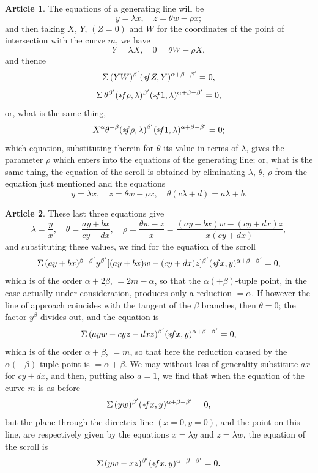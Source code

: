 \documentclass[12pt,a4paper]{article}
\theoremstyle{definition}
\newtheorem{art}{Article}[section]
\begin{document}
\begin{art}
The equations of a generating line will be
\[
y = \lambda x, \quad z = \theta w - \rho x;
\]
and then taking $X$, $Y$, $(Z = 0)$ and $W$ for the coordinates of the point of intersection with the curve $m$, we have
\[
Y = \lambda X, \quad 0 = \theta W - \rho X,
\]
and thence
\[
\Sigma \, (YW)^{\beta'} (* \hspace{-2pt} fZ, Y)^{\alpha + \beta - \beta'} = 0,
\]
\[
\Sigma \, \theta^{\beta'} (* \hspace{-2pt} f\rho, \lambda)^{\beta'} (* \hspace{-2pt} f1, \lambda)^{\alpha + \beta - \beta'} = 0,
\]
or, what is the same thing,
\[
X^{\alpha} \theta^{-\beta} (* \hspace{-2pt} f\rho, \lambda)^{\beta'} (* \hspace{-2pt} f1, \lambda)^{\alpha + \beta - \beta'} = 0;
\]
which equation, substituting therein for $\theta$ its value in terms of $\lambda$, gives the parameter $\rho$ which enters into the equations of the generating line; or, what is the same thing, the equation of the scroll is obtained by eliminating $\lambda$, $\theta$, $\rho$ from the equation just mentioned and the equations
\[
y = \lambda x, \quad z = \theta w - \rho x, \quad \theta(c\lambda + d) = a\lambda + b.
\]
\end{art}

\begin{art}
These last three equations give
\[
\lambda = \frac{y}{x}, \quad \theta = \frac{ay + bx}{cy + dx}, \quad \rho = \frac{\theta w - z}{x} = \frac{(ay + bx)w - (cy + dx)z}{x(cy + dx)},
\]
and substituting these values, we find for the equation of the scroll
\[
\Sigma \, (ay + bx)^{\beta - \beta'} y^{\beta'} [(ay + bx)w - (cy + dx)z]^{\beta'} (* \hspace{-2pt} fx, y)^{\alpha + \beta - \beta'} = 0,
\]
which is of the order $\alpha + 2\beta$, $= 2m - \alpha$, so that the $\alpha (+ \beta)$-tuple point, in the case actually under consideration, produces only a reduction $= \alpha$. If however the line of approach coincides with the tangent of the $\beta$ branches, then $\theta = 0$; the factor $y^\beta$ divides out, and the equation is
\[
\Sigma \, (ayw - cyz - dxz)^{\beta'} (* \hspace{-2pt} fx, y)^{\alpha + \beta - \beta'} = 0,
\]
which is of the order $\alpha + \beta$, $= m$, so that here the reduction caused by the $\alpha (+ \beta)$-tuple point is $= \alpha + \beta$. We may without loss of generality substitute $ax$ for $cy + dx$, and then, putting also $a = 1$, we find that when the equation of the curve $m$ is as before
\[
\Sigma \, (yw)^{\beta'} (* \hspace{-2pt} fx, y)^{\alpha + \beta - \beta'} = 0,
\]
but the plane through the directrix line $(x = 0, y = 0)$, and the point on this line, are respectively given by the equations $x = \lambda y$ and $z = \lambda w$, the equation of the scroll is
\[
\Sigma \, (yw - xz)^{\beta'} (* \hspace{-2pt} fx, y)^{\alpha + \beta - \beta'} = 0.
\]
\end{art}
\end{document}

